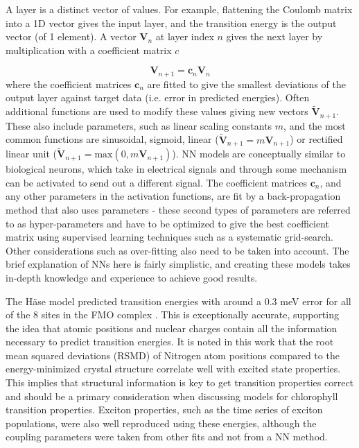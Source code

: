 A layer is a distinct vector of values. For example, flattening the Coulomb matrix
into a 1D vector gives the input layer, and the \Qy transition energy is the output 
vector (of 1 element). A vector $\mathbf{V}_n$ at layer index $n$ gives the next layer
by multiplication with a coefficient matrix $c$

\begin{equation}
	\mathbf{V}_{n+1} = \mathbf{c}_n \mathbf{V}_n	
\end{equation}
%
where the coefficient matrices $\mathbf{c}_n$ are fitted to give the smallest deviations
of the output layer against target data (i.e. error in predicted \Qy energies).
Often additional functions are used to modify these values giving new vectors $\tilde{\mathbf{V}}_{n+1}$.
These also include parameters, such as linear scaling constants $m$, and the most 
common functions are sinusoidal, sigmoid, linear ($\tilde{\mathbf{V}}_{n+1}=m \mathbf{V}_{n+1}$) 
or rectified linear unit ($\tilde{\mathbf{V}}_{n+1}=\text{max}\left(0, m \mathbf{V}_{n+1} \right)$). 
NN models are conceptually similar to biological neurons, which take in electrical
signals and through some mechanism can be activated to send out a different signal.
The coefficient matrices $\mathbf{c}_n$, and any other parameters in the activation
functions, are fit by a back-propagation method that also uses parameters - these
second types of parameters are referred to as hyper-parameters and have to be optimized 
to give the best coefficient matrix using supervised learning techniques such as
a systematic grid-search. Other considerations such as over-fitting also need to 
be taken into account. The brief explanation of NNs here is fairly simplistic, and
creating these models takes in-depth knowledge and experience to achieve good results.

The H\"{a}se model predicted \Qy transition energies with around a 0.3 meV error
for all of the 8 sites in the FMO complex \cite{AspuruGuzik2016}. This is exceptionally
accurate, supporting the idea that atomic positions and nuclear charges contain 
all the information necessary to predict transition energies. It is noted in this
work that the root mean squared deviations (RSMD) of Nitrogen atom positions compared 
to the energy-minimized crystal structure correlate well with excited state properties. 
This implies that structural information is key to get transition properties correct and should be
a primary consideration when discussing models for chlorophyll transition properties.
Exciton properties, such as the time series of exciton populations, were also well 
reproduced using these \Qy energies, although the coupling parameters were taken 
from other fits and not from a NN method.


